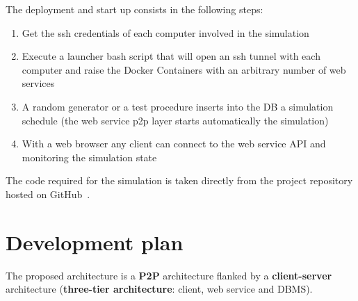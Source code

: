 The deployment and start up consists in the following steps:
\begin{enumerate}
    \item Get the ssh credentials of each computer involved in the simulation
    \item Execute a launcher bash script that will open an ssh tunnel with each computer and 
        raise the Docker Containers with an arbitrary number of web services 
    \item A random generator or a test procedure inserts into the DB a simulation schedule
        (the web service p2p layer starts automatically the simulation)
    \item With a web browser any client can connect to the web service API and monitoring 
        the simulation state   
\end{enumerate}

The code required for the simulation is taken directly from the project repository hosted on 
GitHub~\cite{2}.


\section{Development plan}

The proposed architecture is a \textbf{P2P} architecture flanked by a 
\textbf{client-server} architecture (\textbf{three-tier architecture}: client, web service and DBMS).
